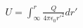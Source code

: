 \documentclass[preview]{standalone}
\begin{document}
\begin{align*}
U = \int_{\infty}^{r} \frac{Q}{4\pi \epsilon_0 r'^2} dr'
\end{align*}
\end{document}
